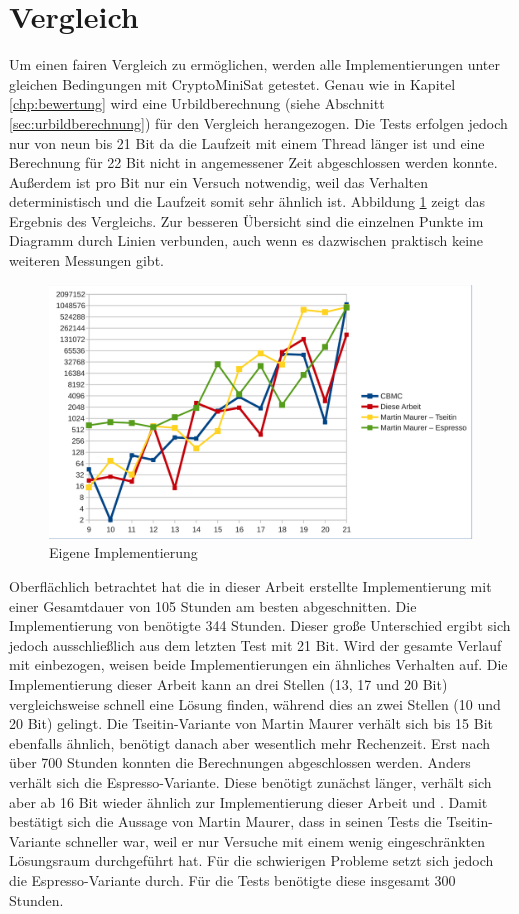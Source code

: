 \section{Vergleich}
\label{sec:vergleich}

Um einen fairen Vergleich zu ermöglichen, werden alle Implementierungen unter gleichen Bedingungen mit CryptoMiniSat
getestet. Genau wie in Kapitel \ref{chp:bewertung} wird eine Urbildberechnung (siehe Abschnitt \ref{sec:urbildberechnung})
für den Vergleich herangezogen. Die Tests erfolgen jedoch nur von neun bis 21 Bit da die Laufzeit mit einem Thread länger
ist und eine Berechnung für 22 Bit nicht in angemessener Zeit abgeschlossen werden konnte. Außerdem ist pro Bit nur ein
Versuch notwendig, weil das Verhalten deterministisch und die Laufzeit somit sehr ähnlich ist. Abbildung \ref{fig:eval_final}
zeigt das Ergebnis des Vergleichs. Zur besseren Übersicht sind die einzelnen Punkte im Diagramm durch Linien verbunden, auch
wenn es dazwischen praktisch keine weiteren Messungen gibt.
\begin{figure}[!h]
  \centering
  \includegraphics[scale=0.55]{images/eval_final}
  \caption{Eigene Implementierung}
  \label{fig:eval_final}
\end{figure}

Oberflächlich betrachtet hat die in dieser Arbeit erstellte Implementierung mit einer Gesamtdauer von 105 Stunden am besten abgeschnitten.
Die Implementierung von  benötigte 344 Stunden. Dieser große Unterschied ergibt sich jedoch ausschließlich aus dem
letzten Test mit 21 Bit. Wird der gesamte Verlauf mit einbezogen, weisen beide Implementierungen ein ähnliches Verhalten auf. Die
Implementierung dieser Arbeit kann an drei Stellen (13, 17 und 20 Bit) vergleichsweise schnell eine Lösung finden, während  dies
an zwei Stellen (10 und 20 Bit) gelingt. Die Tseitin-Variante von Martin Maurer verhält sich bis 15 Bit ebenfalls ähnlich, benötigt danach
aber wesentlich mehr Rechenzeit. Erst nach über 700 Stunden konnten die Berechnungen abgeschlossen werden.
Anders verhält sich die Espresso-Variante. Diese benötigt zunächst länger, verhält sich aber ab 16 Bit wieder ähnlich
zur Implementierung dieser Arbeit und . Damit bestätigt sich die Aussage von Martin Maurer, dass in seinen Tests die Tseitin-Variante
schneller war, weil er nur Versuche mit einem wenig eingeschränkten Lösungsraum durchgeführt hat. Für die schwierigen Probleme
setzt sich jedoch die Espresso-Variante durch. Für die Tests benötigte diese insgesamt 300 Stunden.